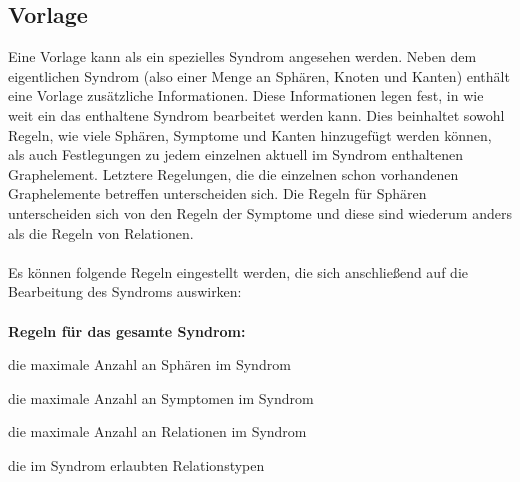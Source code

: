 \documentclass[enabledeprecatedfontcommands,fontsize=11pt,paper=a4,twoside]{scrartcl}
\newcommand*{\bbe}{\textcolor{bbe}}
\newcounter{one}
\let\origenumerate\enumerate
\let\origendenumerate\endenumerate
\renewenvironment{enumerate}{\origenumerate \addtolength{\itemsep}{-10.0pt}}{\origendenumerate}
\begin{document}
	\begin{figure}[ht!]
		\centering
	
	\end{figure}
		

\clearpage
\subsection{Vorlage} \label{template}
Eine Vorlage kann als ein spezielles Syndrom angesehen werden. Neben dem eigentlichen Syndrom (also einer Menge an Sphären, Knoten und Kanten) enthält eine Vorlage zusätzliche Informationen. Diese Informationen legen fest, in wie weit ein das enthaltene Syndrom bearbeitet werden kann. Dies beinhaltet sowohl Regeln, wie viele Sphären, Symptome und Kanten hinzugefügt werden können, als auch Festlegungen zu jedem einzelnen aktuell im Syndrom enthaltenen Graphelement. Letztere Regelungen, die die einzelnen schon vorhandenen Graphelemente betreffen unterscheiden sich. Die Regeln für Sphären unterscheiden sich von den Regeln der Symptome und diese sind wiederum anders als die Regeln von Relationen. \\ \\
Es können folgende Regeln eingestellt werden, die sich anschließend auf die Bearbeitung des Syndroms auswirken: \\ \\
\textbf{\bbe{Regeln für das gesamte Syndrom:}}
\begin{enumerate}
	\item die maximale Anzahl an Sphären im Syndrom
	\item die maximale Anzahl an Symptomen im Syndrom 
	\item die maximale Anzahl an Relationen im Syndrom
	\item die im Syndrom erlaubten Relationstypen
\end{enumerate}
\end{document}

